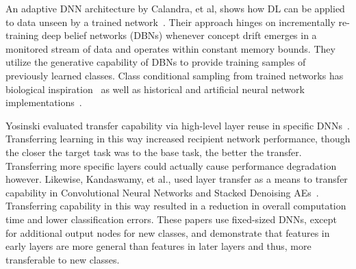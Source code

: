 \documentclass[10pt,conference]{IEEEtran}
\begin{document}
An adaptive DNN architecture by Calandra, et al, shows how DL can be applied to data unseen by a trained network~\cite{calandra2012learning}. Their approach hinges on incrementally re-training deep belief networks (DBNs) whenever concept drift emerges in a monitored stream of data and operates within constant memory bounds. They utilize the generative capability of DBNs to provide training samples of previously learned classes. Class conditional sampling from trained networks has biological inspiration~\cite{carr2011hippocampal,louie2001temporally,stickgold2005sleep,felleman1991distributed} as well as historical and artificial neural network implementations~\cite{hinton1995wake, salakhutdinov2009learning, gregor2015draw, rudy2014generative}.

Yosinski evaluated transfer capability via high-level layer reuse in specific DNNs~\cite{yosinski2014transferable}. Transferring learning in this way increased recipient network performance, though the closer the target task was to the base task, the better the transfer. Transferring more specific layers could actually cause performance degradation however. Likewise, Kandaswamy, et al., used layer transfer as a means to transfer capability in Convolutional Neural Networks and Stacked Denoising AEs~\cite{kandaswamy2014improving}. Transferring capability in this way resulted in a reduction in overall computation time and lower classification errors. These papers use fixed-sized DNNs, except for additional output nodes for new classes, and demonstrate that features in early layers are more general than features in later layers and thus, more transferable to new classes.
\end{document}
